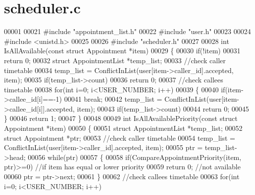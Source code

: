 \section{scheduler.\+c}
\label{scheduler_8c_source}

\begin{DoxyCode}
00001 
00021 \textcolor{preprocessor}{#include "appointment_list.h"}
00022 \textcolor{preprocessor}{#include "user.h"}
00023 
00024 \textcolor{preprocessor}{#include <unistd.h>}
00025 
00026 \textcolor{preprocessor}{#include "scheduler.h"}
00027 
00028 \textcolor{keywordtype}{int} IsAllAvailable(\textcolor{keyword}{const} \textcolor{keyword}{struct} Appointment *item)
00029 \{
00030     \textcolor{keywordflow}{if}(!item)
00031         \textcolor{keywordflow}{return} 0;
00032     \textcolor{keyword}{struct }AppointmentList *temp\_list;
00033     \textcolor{comment}{//check caller timetable}
00034     temp\_list = ConflictInList(user[item->caller_id].accepted, item);
00035     \textcolor{keywordflow}{if}(temp\_list->count)
00036         \textcolor{keywordflow}{return} 0;
00037     \textcolor{comment}{//check callees timetable}
00038     \textcolor{keywordflow}{for}(\textcolor{keywordtype}{int} i=0; i<USER_NUMBER; i++)
00039     \{
00040         \textcolor{keywordflow}{if}(item->callee_id[i]==-1)
00041             \textcolor{keywordflow}{break};
00042         temp\_list = ConflictInList(user[item->callee_id[i]].accepted, item);
00043         \textcolor{keywordflow}{if}(temp\_list->count)
00044             \textcolor{keywordflow}{return} 0;
00045     \}
00046     \textcolor{keywordflow}{return} 1;
00047 \}
00048 
00049 \textcolor{keywordtype}{int} IsAllAvailablePriority(\textcolor{keyword}{const} \textcolor{keyword}{struct} Appointment *item)
00050 \{
00051     \textcolor{keyword}{struct }AppointmentList *temp\_list;
00052     \textcolor{keyword}{struct }Appointment *ptr;
00053     \textcolor{comment}{//check caller timetable}
00054     temp\_list = ConflictInList(user[item->caller_id].accepted, item);
00055     ptr = temp\_list->head;
00056     \textcolor{keywordflow}{while}(ptr)
00057     \{
00058         \textcolor{keywordflow}{if}(CompareAppointmentPriority(item, ptr)>=0)    \textcolor{comment}{//if item has equal or lower priority}
00059             \textcolor{keywordflow}{return} 0;   \textcolor{comment}{//not available}
00060         ptr = ptr->next;
00061     \}
00062     \textcolor{comment}{//check callees timetable}
00063     \textcolor{keywordflow}{for}(\textcolor{keywordtype}{int} i=0; i<USER_NUMBER; i++)

\end{DoxyCode}
